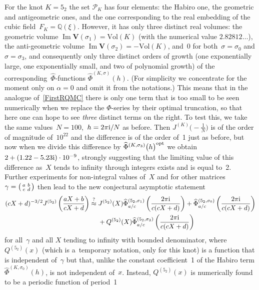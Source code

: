 \documentclass[pdftex]{sigma}
\numberwithin{equation}{section}
\def\calP{\mathcal P}
\def\calP{\mathcal P}
\def\Vol{\mathrm{Vol}}
\def\Phih{\widehat\Phi}
\def\a{\alpha}
\def\Q{\mathbb Q}
\def\a{\alpha}
\def\s{\sigma}
\def\sma#1#2#3#4{\bigl(\smallmatrix#1&#2\\#3&#4\endsmallmatrix\bigr)} %
\def\J{\mathbf J} \def\J{J} %
\def\V{\mathbf V}
\def\g{\gamma}
\begin{document}
For the knot $K=5_2$ the set $\calP_K$ has four elements: the Habiro one, the
geometric and antigeometric ones, and the one corresponding to the real embedding
of the cubic field~$F_K=\Q(\xi)$. However, it has only three distinct real volumes:
the geometric volume $\operatorname{Im} \V(\s_1)=\Vol(K)$ (with the numerical value
$2.82812\dots$), the anti-geometric volume $\operatorname{Im} \V(\s_2)=-\Vol(K)$,
and~0 for both~${\s=\s_0}$ and $\s=\s_3$, and consequently only three distinct orders
of growth (one exponentially large, one exponentially small, and two of polynomial
growth) of the corresponding~$\Phih$-functions $\Phih^{(K,\s)}(h)$. (For simplicity
we concentrate for the moment only on $\a=0$ and omit it from the notations.)
This means that in the analogue of~\eqref{FirstRQMC} there is only one term that
is too small to be seen numerically when we replace the $\Phi$-series by their
optimal truncation, so that here one can hope to see \emph{three} distinct terms
on the right. To test this, we take the same values~${N=100}$,~$h=2\pi {\rm i}/N$ as before. Then
$\J^{(K)}\bigl(-\frac1N\bigr)$ is of the order of magnitude of~$10^{22}$ and
the difference \smash{$N^{-3/2}\J^{(K)}\bigl(-\frac1N\bigr)-\Phih^{(K,\s_1)}
\bigl(h\bigr)^{{\rm opt}} -\Phih^{(K,\s_0)}\bigl(h\bigr)^{{\rm opt}}$}
is of the order of~1 just as before, but now when we divide this difference by
$\Phih^{(K,\s_3)}\bigl(h\bigr)^{{\rm opt}}$ we obtain $2 + (1.22-5.23{\rm i})\cdot10^{-9}$,
strongly suggesting that the limiting value of this difference as~$X$ tends to
infinity through integers exists and is equal to~2. Further experiments for
non-integral values of~$X$ and for other matrices $\g=\sma abcd$ then lead to
the new conjectural asymptotic statement
\begin{align}
 (cX+d)^{-3/2} \J^{(5_2)}\left(\frac{aX+b}{cX+d}\right) \overset?\approx{}&  \J^{(5_2)}(X) \Phih^{(5_2,\s_1)}_{a/c}
 \left(\frac{2\pi {\rm i}}{c(cX+d)}\right)
 + \Phih^{(5_2,\s_0)}_{a/c}\left(\frac{2\pi {\rm i}}{c(cX+d)}\right)\nonumber\\
& + Q^{(5_2)}(X) \Phih^{(5_2,\s_3)}_{a/c}\left(\frac{2\pi {\rm i}}{c(cX+d)}\right)
 \label{52WeakRQMC}\end{align}
for all~$\g$ and all $X$ tending to infinity with bounded denominator, where
$Q^{(5_2)}(x)$ (which is a~temporary notation, only for this knot) is a function
that is independent of~$\g$ but that, unlike the constant
coefficient~1 of the Habiro term $\Phih^{(K,\s_0)}(h)$, is not independent of~$x$.
Instead, $Q^{(5_2)}(x)$ is numerically found to be a periodic function of period~1
\end{document}

